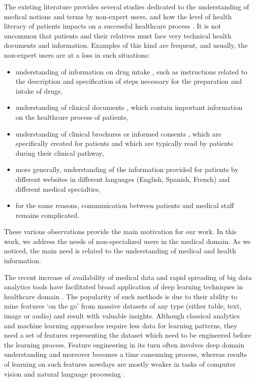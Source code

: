 The existing literature provides several studies dedicated to the understanding of medical notions and terms by non-expert users, and how the level of health literacy of patients impacts on a successful healthcare process \citep{McCray-JAMIA2005, Eysenbach-JMIR2007}. It is not uncommon that patients and their relatives must face very technical health documents and information. Examples of this kind are frequent, and usually, the non-expert users are at a loss in such situations:

\begin{itemize}
    \item  understanding of information on drug intake \citep{VanderStichele-WILEY1999, Patel-IJMI2002}, such as instructions related to the description and specification of steps necessary for the preparation and intake of drugs,
    
    \item  understanding of clinical documents \citep{Zeng-MEDINFO2007}, which contain important information on the healthcare process of patients,
    
    \item  understanding of clinical brochures or informed consents \citep{Williams-JAMA1995}, which are specifically created for patients and which are typically read by patients during their clinical pathway,
    
    \item  more generally, understanding of the information provided for patients by different websites \citep{Oregon-2008, Brigo-EB2015} in different languages (English, Spanish, French) and different medical specialties,
    
    \item for the same reasons, communication between patients and medical staff \citep{Jucks-HC2007, Tran-EC2009} remains complicated.
\end{itemize}
These various observations provide the main motivation for our work. In this work, we address the needs of non-specialized users in the medical domain. As we noticed, the main need is related to the understanding of medical and health information. 

The recent increase of availability of medical data and rapid spreading of big data analytics tools have facilitated broad application of deep learning techniques in healthcare domain \citep{Jiang-BMJ2017}. The popularity of such methods is due to their ability to mine features `on the go' from massive datasets of any type (either table, text, image or audio) and result with valuable insights. Although classical analytics and machine learning approaches require less data for learning patterns, they need a set of features representing the dataset which need to be engineered before the learning process. Feature engineering in its turn often involves deep domain understanding and moreover becomes a time consuming process, whereas results of learning on such features nowdays are mostly weaker in tasks of computer vision and natural language processing \citep{Krizhevsky-NIPS2012, Zhang-NIPS2015}.   

